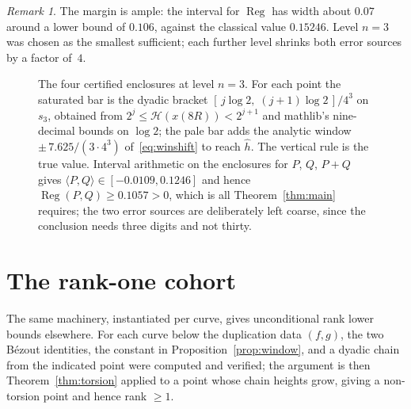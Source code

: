 \documentclass[11pt,reqno]{amsart}
\newcommand{\pffig}[1]{}
\theoremstyle{plain}
\theoremstyle{definition}
\theoremstyle{remark}
\newtheorem{remark}[theorem]{Remark}
\newcommand{\hh}{\widehat{h}}
\DeclareMathOperator{\reg}{Reg}
\begin{document}
\begin{remark}
The margin is ample: the interval for $\reg$ has width about $0.07$ around a
lower bound of $0.106$, against the classical value $0.15246$. Level $n=3$
was chosen as the smallest sufficient; each further level shrinks both error
sources by a factor of~$4$.
\end{remark}

\begin{figure}[htbp]
\centering
\pffig{fig_certified_windows}
\caption{The four certified enclosures at level $n=3$. For each point the
saturated bar is the dyadic bracket
$[\,j\log 2,\;(j+1)\log 2\,]/4^3$ on $s_3$, obtained from
$2^j \le \mathcal{H}(x(8R)) < 2^{j+1}$ and mathlib's nine-decimal bounds on
$\log 2$; the pale bar adds the analytic window
$\pm\,7.625/(3\cdot 4^3)$ of~\eqref{eq:winshift} to reach $\hh$. The
vertical rule is the true value. Interval arithmetic on the enclosures for
$P$, $Q$, $P{+}Q$ gives
$\langle P,Q\rangle \in [-0.0109, 0.1246]$ and hence
$\reg(P,Q) \ge 0.1057 > 0$, which is all Theorem~\ref{thm:main} requires;
the two error sources are deliberately left coarse, since the conclusion
needs three digits and not thirty.}
\label{fig:windows}
\end{figure}

\section{The rank-one cohort}

The same machinery, instantiated per curve, gives unconditional rank lower
bounds elsewhere. For each curve below the duplication data $(f,g)$, the two
B\'ezout identities, the constant in Proposition~\ref{prop:window}, and a
dyadic chain from the indicated point were computed and verified; the
argument is then Theorem~\ref{thm:torsion} applied to a point whose chain
heights grow, giving a non-torsion point and hence rank $\ge 1$.
\end{document}

